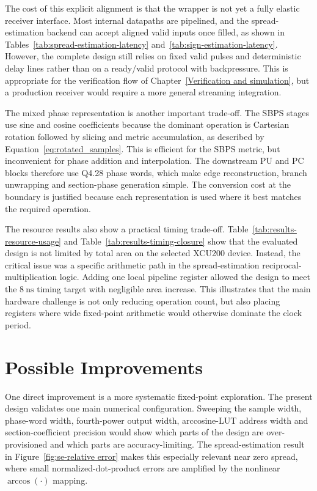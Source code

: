 The cost of this explicit alignment is that the wrapper is not yet a fully elastic receiver interface. Most internal datapaths are pipelined, and the spread-estimation backend can accept aligned valid inputs once filled, as shown in Tables~\ref{tab:spread-estimation-latency} and~\ref{tab:sign-estimation-latency}. However, the complete design still relies on fixed valid pulses and deterministic delay lines rather than on a ready/valid protocol with backpressure. This is appropriate for the verification flow of Chapter~\ref{Verification and simulation}, but a production receiver would require a more general streaming integration.

The mixed phase representation is another important trade-off. The \ac{SBPS} stages use sine and cosine coefficients because the dominant operation is Cartesian rotation followed by slicing and metric accumulation, as described by Equation~\ref{eq:rotated_samples}. This is efficient for the \ac{SBPS} metric, but inconvenient for phase addition and interpolation. The downstream \ac{PU} and \ac{PC} blocks therefore use Q4.28 phase words, which make edge reconstruction, branch unwrapping and section-phase generation simple. The conversion cost at the boundary is justified because each representation is used where it best matches the required operation.

The resource results also show a practical timing trade-off. Table~\ref{tab:results-resource-usage} and Table~\ref{tab:results-timing-closure} show that the evaluated design is not limited by total area on the selected XCU200 device. Instead, the critical issue was a specific arithmetic path in the spread-estimation reciprocal-multiplication logic. Adding one local pipeline register allowed the design to meet the \(8~\mathrm{ns}\) timing target with negligible area increase. This illustrates that the main hardware challenge is not only reducing operation count, but also placing registers where wide fixed-point arithmetic would otherwise dominate the clock period.

\section{Possible Improvements}

One direct improvement is a more systematic fixed-point exploration. The present design validates one main numerical configuration. Sweeping the sample width, phase-word width, fourth-power output width, arccosine-\ac{LUT} address width and section-coefficient precision would show which parts of the design are over-provisioned and which parts are accuracy-limiting. The spread-estimation result in Figure~\ref{fig:se-relative error} makes this especially relevant near zero spread, where small normalized-dot-product errors are amplified by the nonlinear \(\arccos(\cdot)\) mapping.

